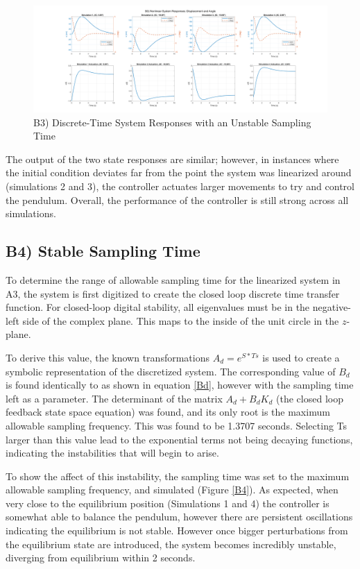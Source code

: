 \documentclass{article}
\begin{document}
\begin{figure}[H]
    \centering
    \includegraphics[width=\textwidth]{figures/b3_x.png}
    \caption{B3) Discrete-Time System Responses with an Unstable Sampling Time}
    \label{B3}
\end{figure}

The output of the two state responses are similar; however, in instances where the initial condition deviates far from the point the system was linearized around (simulations 2 and 3), the controller actuates larger movements to try and control the pendulum. Overall, the performance of the controller is still strong across all simulations.

\subsection*{B4) Stable Sampling Time}

To determine the range of allowable sampling time for the linearized system in A3, the system is first digitized to create the closed loop discrete time transfer function. For closed-loop digital stability, all eigenvalues must be in the negative-left side of the complex plane. This maps to the inside of the unit circle in the $z$-plane.
\newline

To derive this value, the known transformations $ A_d=e^{S*Ts}$ is used to create a symbolic representation of the discretized system. The corresponding value of $B_d$ is found identically to as shown in equation \ref{Bd}, however with the sampling time left as a parameter. The determinant of the matrix $A_d+B_dK_d$ (the closed loop feedback state space equation) was found, and its only root is the maximum allowable sampling frequency. This was found to be 1.3707 seconds. Selecting Ts larger than this value lead to the exponential terms not being decaying functions, indicating the instabilities that will begin to arise.
\newline

To show the affect of this instability, the sampling time was set to the maximum allowable sampling frequency, and simulated (Figure \ref{B4}). As expected, when very close to the equilibrium position (Simulations 1 and 4) the controller is somewhat able to balance the pendulum, however there are persistent oscillations indicating the equilibrium is not stable. However once bigger perturbations from the equilibrium state are introduced, the system becomes incredibly unstable, diverging from equilibrium within 2 seconds.
\end{document}
